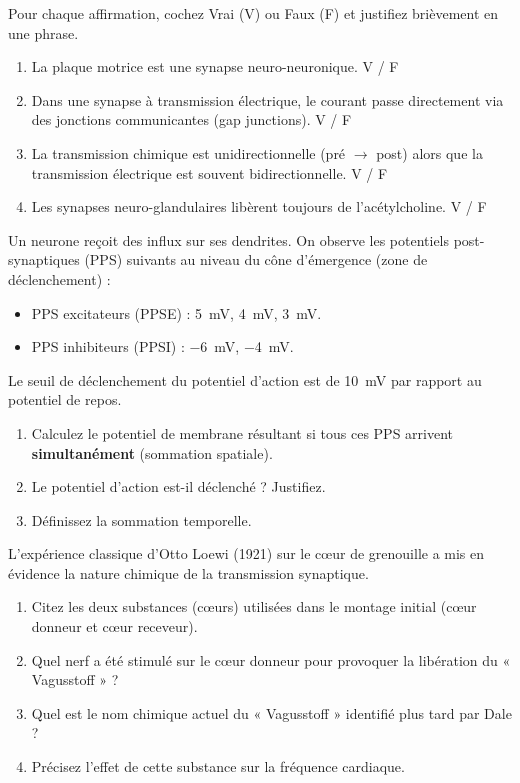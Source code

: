 \documentclass[11pt]{article}
\begin{document}
\begin{exercice}
Pour chaque affirmation, cochez Vrai (V) ou Faux (F) et justifiez brièvement en une phrase.
\begin{enumerate}
    \item La plaque motrice est une synapse neuro-neuronique. \hfill V / F
    \item Dans une synapse à transmission électrique, le courant passe directement via des jonctions communicantes (gap junctions). \hfill V / F
    \item La transmission chimique est unidirectionnelle (pré $\to$ post) alors que la transmission électrique est souvent bidirectionnelle. \hfill V / F
    \item Les synapses neuro-glandulaires libèrent toujours de l'acétylcholine. \hfill V / F
\end{enumerate}
\end{exercice}

\begin{exercice}
Un neurone reçoit des influx sur ses dendrites. On observe les potentiels post-synaptiques (PPS) suivants au niveau du cône d'émergence (zone de déclenchement) :
\begin{itemize}
    \item PPS excitateurs (PPSE) : \SI{5}{\milli\volt}, \SI{4}{\milli\volt}, \SI{3}{\milli\volt}.
    \item PPS inhibiteurs (PPSI) : \SI{-6}{\milli\volt}, \SI{-4}{\milli\volt}.
\end{itemize}
Le seuil de déclenchement du potentiel d'action est de \SI{10}{\milli\volt} par rapport au potentiel de repos.
\begin{enumerate}
    \item Calculez le potentiel de membrane résultant si tous ces PPS arrivent \textbf{simultanément} (sommation spatiale).
    \item Le potentiel d'action est-il déclenché ? Justifiez.
    \item Définissez la sommation temporelle.
\end{enumerate}
\end{exercice}

\begin{exercice}
L'expérience classique d'Otto Loewi (1921) sur le cœur de grenouille a mis en évidence la nature chimique de la transmission synaptique.
\begin{enumerate}
    \item Citez les deux substances (cœurs) utilisées dans le montage initial (cœur donneur et cœur receveur).
    \item Quel nerf a été stimulé sur le cœur donneur pour provoquer la libération du « Vagusstoff » ?
    \item Quel est le nom chimique actuel du « Vagusstoff » identifié plus tard par Dale ?
    \item Précisez l'effet de cette substance sur la fréquence cardiaque.
\end{enumerate}
\end{exercice}
\end{document}
